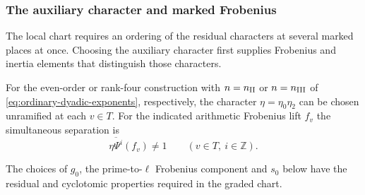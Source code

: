 \subsubsection{The auxiliary character and marked Frobenius}
\label{par:dyadic-residual}

The local chart requires an ordering of the residual characters at several marked places at once. Choosing the auxiliary character first supplies Frobenius and inertia elements that distinguish those characters.

\begin{lemma}\label{lem:marked-dyadic-character}
For the even-order or rank-four construction with
\(n=n_{\rm II}\) or \(n=n_{\rm III}\) of \eqref{eq:ordinary-dyadic-exponents},
respectively, the character \(\eta=\eta_0\eta_2\)
can be chosen unramified at each \(v\in T\). For the indicated arithmetic Frobenius lift \(f_v\) the simultaneous separation is 
\[
 \overline{\eta\Psi^i}(f_v)\ne1\qquad(v\in T,\ i\in\mathbb Z).
\]

The choices of \(g_0\), the prime-to-\(\ell\) Frobenius component
and \(s_0\) below have the residual and cyclotomic properties
required in the graded chart.
\end{lemma}

